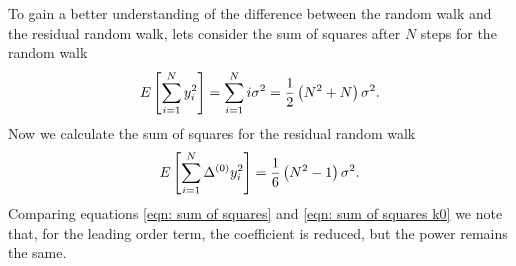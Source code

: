 To gain a better understanding of the difference between the random walk and
the residual random walk, lets consider the sum of squares after $N$ steps for
the random walk
\begin{equation}
E\left[\sum_{i=1}^{N} y_{i}^{2}\right] = \sum_{i=1}^{N} i \sigma^{2} =
                               \frac{1}{2}\left(N^{2} + N\right)\sigma^{2}.
\label{eqn: sum of squares}
\end{equation}
Now we calculate the sum of squares for the residual random walk
\begin{equation}
E\left[\sum_{i=1}^{N} \Delta^{(0)} y_{i}^{2}\right] = \frac{1}{6}\left(N^{2} -1\right)\sigma^{2}.
\label{eqn: sum of squares k0}
\end{equation}
Comparing equations \eqref{eqn: sum of squares} and \eqref{eqn: sum of squares
k0} we note that, for the leading order term, the coefficient is reduced, but
the power remains the same.

%

